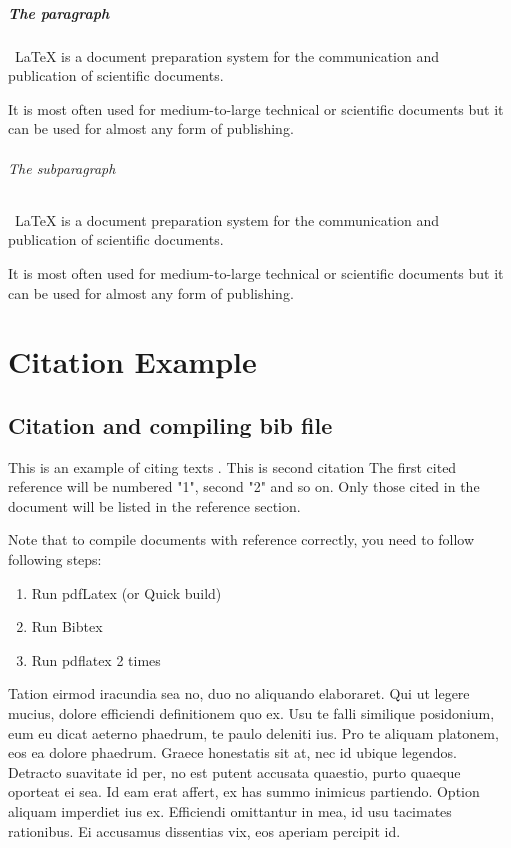 \paragraph{The paragraph}
\ LaTeX  is a document preparation system for the communication and publication of scientific documents. \par It is most often used for medium-to-large technical or scientific documents but it can be used for almost any form of publishing.
\subparagraph{The subparagraph}
\ LaTeX  is a document preparation system for the communication and publication of scientific documents. \par It is most often used for medium-to-large technical or scientific documents but it can be used for almost any form of publishing.

 
\chapter{Citation Example}
\section{Citation and compiling bib file}
This is an example of citing texts \cite{Li2014}. This is second citation \cite{Yasir2014} The first cited reference will be numbered "1", second "2" and so on. Only those cited in the document will be listed in the reference section.

Note that to compile documents with reference correctly, you need to follow following steps:
\vspace{-18pt}
\begin{enumerate}
	\item Run pdfLatex (or Quick build)
	\item Run Bibtex 
	\item Run pdflatex 2 times
\end{enumerate}
 
Tation eirmod iracundia sea no, duo no aliquando elaboraret. Qui ut legere mucius, dolore efficiendi definitionem quo ex. Usu te falli similique posidonium, eum eu dicat aeterno phaedrum, te paulo deleniti ius. Pro te aliquam platonem, eos ea dolore phaedrum. Graece honestatis sit at, nec id ubique legendos.
Detracto suavitate id per, no est putent accusata quaestio, purto quaeque oporteat ei sea. Id eam erat affert, ex has summo inimicus partiendo. Option aliquam imperdiet ius ex. Efficiendi omittantur in mea, id usu tacimates rationibus. Ei accusamus dissentias vix, eos aperiam percipit id.

